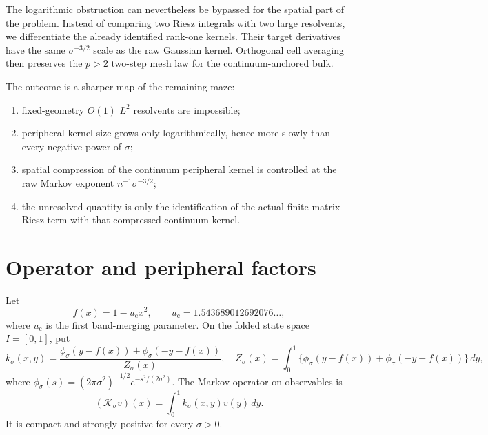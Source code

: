 \documentclass[11pt]{article}
\theoremstyle{remark}
\newcommand{\cK}{\mathcal K}
\newcommand{\uc}{u_{\mathrm c}}
\begin{document}
The logarithmic obstruction can nevertheless be bypassed for the spatial
part of the problem.  Instead of comparing two Riesz integrals with two
large resolvents, we differentiate the already identified rank-one kernels.
Their target derivatives have the same $\sigma^{-3/2}$ scale as the raw
Gaussian kernel.  Orthogonal cell averaging then preserves the $p>2$
two-step mesh law for the continuum-anchored bulk.

The outcome is a sharper map of the remaining maze:
\begin{enumerate}[label=\textbf{G\arabic*.},leftmargin=3em]
 \item fixed-geometry $O(1)$ $L^2$ resolvents are impossible;
 \item peripheral kernel size grows only logarithmically, hence more slowly
       than every negative power of $\sigma$;
 \item spatial compression of the continuum peripheral kernel is controlled
       at the raw Markov exponent $n^{-1}\sigma^{-3/2}$;
 \item the unresolved quantity is only the identification of the actual
       finite-matrix Riesz term with that compressed continuum kernel.
\end{enumerate}

\section{Operator and peripheral factors}
\label{sec:operator}

Let
\begin{equation}
 f(x)=1-\uc x^2,
 \qquad
 \uc=1.543689012692076\ldots,
 \label{eq:map}
\end{equation}
where $\uc$ is the first band-merging parameter.  On the folded state space
$I=[0,1]$, put
\begin{equation}
 k_\sigma(x,y)
 =\frac{\phi_\sigma(y-f(x))+\phi_\sigma(-y-f(x))}
 {Z_\sigma(x)},
 \quad
 Z_\sigma(x)=\int_0^1
 \{\phi_\sigma(y-f(x))+\phi_\sigma(-y-f(x))\}\,dy,
 \label{eq:kernel}
\end{equation}
where
$\phi_\sigma(s)=(2\pi\sigma^2)^{-1/2}e^{-s^2/(2\sigma^2)}$.
The Markov operator on observables is
\begin{equation}
 (\cK_\sigma v)(x)=\int_0^1k_\sigma(x,y)v(y)\,dy.
 \label{eq:operator}
\end{equation}
It is compact and strongly positive for every $\sigma>0$.
\end{document}
